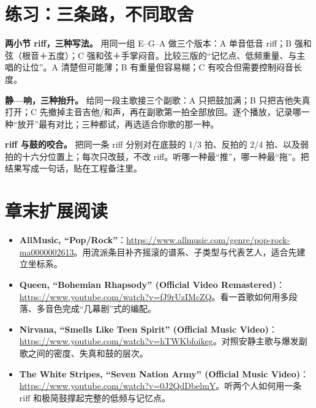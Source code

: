 \section{练习：三条路，不同取舍}
\label{sec:rock-practice}

\begin{exercise}
\textbf{两小节 riff，三种写法。} 用同一组 E–G–A 做三个版本：A 单音低音 riff；B 强和弦（根音＋五度）；C 强和弦＋手掌闷音。比较三版的“记忆点、低频重量、与主唱的让位”。A 清楚但可能薄；B 有重量但容易糊；C 有咬合但需要控制闷音长度。
\end{exercise}

\begin{exercise}
\textbf{静—响，三种抬升。} 给同一段主歌接三个副歌：A 只把鼓加满；B 只把吉他失真打开；C 先撤掉主音吉他/和声，再在副歌第一拍全部放回。逐个播放，记录哪一种“放开”最有对比；三种都试，再选适合你歌的那一种。
\end{exercise}

\begin{exercise}
\textbf{ riff 与鼓的咬合。} 把同一条 riff 分别对在底鼓的 1/3 拍、反拍的 2/4 拍、以及弱拍的十六分位置上；每次只改鼓，不改 riff。听哪一种最“推”，哪一种最“拖”。把结果写成一句话，贴在工程备注里。
\end{exercise}

\section{章末扩展阅读}
\label{sec:rock-reading}

\begin{sloppypar}
\begin{itemize}
\item \textbf{AllMusic, “Pop/Rock”}：\url{https://www.allmusic.com/genre/pop-rock-ma0000002613}。用流派条目补齐摇滚的谱系、子类型与代表艺人，适合先建立坐标系。
\item \textbf{Queen, “Bohemian Rhapsody” (Official Video Remastered)}：\url{https://www.youtube.com/watch?v=fJ9rUzIMcZQ}。看一首歌如何用多段落、多音色完成“几幕剧”式的编配。
\item \textbf{Nirvana, “Smells Like Teen Spirit” (Official Music Video)}：\url{https://www.youtube.com/watch?v=hTWKbfoikeg}。对照安静主歌与爆发副歌之间的密度、失真和鼓的层次。
\item \textbf{The White Stripes, “Seven Nation Army” (Official Music Video)}：\url{https://www.youtube.com/watch?v=0J2QdDbelmY}。听两个人如何用一条 riff 和极简鼓撑起完整的低频与记忆点。
\end{itemize}
\end{sloppypar}

